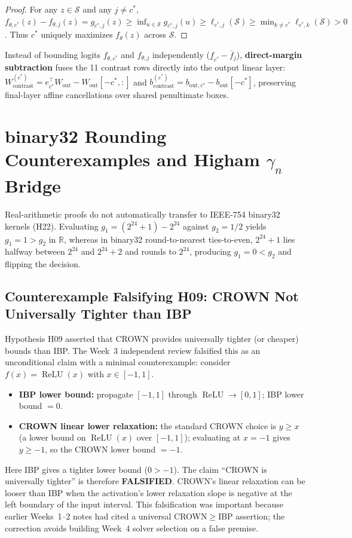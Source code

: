 \documentclass[11pt,oneside,a4paper]{report}
\newcommand{\R}{\mathbb{R}}
\newcommand{\code}[1]{{\small\upshape\ttfamily #1}}
\newcommand{\relu}{\operatorname{ReLU}}
\newcommand{\Sset}{\mathcal{S}}
\theoremstyle{remark}
\begin{document}
\begin{proof}
For any $z \in \Sset$ and any $j \neq c^*$, $f_{\theta,c^*}(z) - f_{\theta,j}(z) = g_{c^*,j}(z) \ge \inf_{u \in \Sset} g_{c^*,j}(u) \ge \ell_{c^*,j}(\Sset) \ge \min_{k \neq c^*} \ell_{c^*,k}(\Sset) > 0$. Thus $c^*$ uniquely maximizes $f_\theta(z)$ across $\Sset$.
\end{proof}

Instead of bounding logits $f_{\theta,c^*}$ and $f_{\theta,j}$ independently ($\underline{f}_{c^*} - \overline{f}_j$), \textbf{direct-margin subtraction} fuses the 11 contrast rows directly into the output linear layer: $W_{\text{contrast}}^{(c^*)} = e_{c^*}^\top W_{\text{out}} - W_{\text{out}}[-c^*,:]$ and $b_{\text{contrast}}^{(c^*)} = b_{\text{out},c^*} - b_{\text{out}}[-c^*]$, preserving final-layer affine cancellations over shared penultimate boxes.

\section{\code{binary32} Rounding Counterexamples and Higham $\gamma_n$ Bridge}
Real-arithmetic proofs do not automatically transfer to IEEE-754 \code{binary32} kernels (\code{H22}). Evaluating $g_1 = (2^{24}+1) - 2^{24}$ against $g_2 = 1/2$ yields $g_1 = 1 > g_2$ in $\R$, whereas in \code{binary32} round-to-nearest ties-to-even, $2^{24}+1$ lies halfway between $2^{24}$ and $2^{24}+2$ and rounds to $2^{24}$, producing $g_1 = 0 < g_2$ and flipping the decision.

\subsection{Counterexample Falsifying H09: CROWN Not Universally Tighter than IBP}
Hypothesis H09 asserted that CROWN provides universally tighter (or cheaper) bounds than IBP. The Week~3 independent review falsified this as an unconditional claim with a minimal counterexample: consider $f(x) = \relu(x)$ with $x \in [-1, 1]$.
\begin{itemize}[leftmargin=1.5em]
  \item \textbf{IBP lower bound:} propagate $[-1, 1]$ through $\relu \to [0, 1]$; IBP lower bound $= 0$.
  \item \textbf{CROWN linear lower relaxation:} the standard CROWN choice is $y \geq x$ (a lower bound on $\relu(x)$ over $[-1,1]$); evaluating at $x = -1$ gives $y \geq -1$, so the CROWN lower bound $= -1$.
\end{itemize}
Here IBP gives a tighter lower bound ($0 > -1$). The claim ``CROWN is universally tighter'' is therefore \textbf{FALSIFIED}. CROWN's linear relaxation can be looser than IBP when the activation's lower relaxation slope is negative at the left boundary of the input interval. This falsification was important because earlier Weeks~1--2 notes had cited a universal CROWN$\geq$IBP assertion; the correction avoids building Week~4 solver selection on a false premise.
\end{document}
